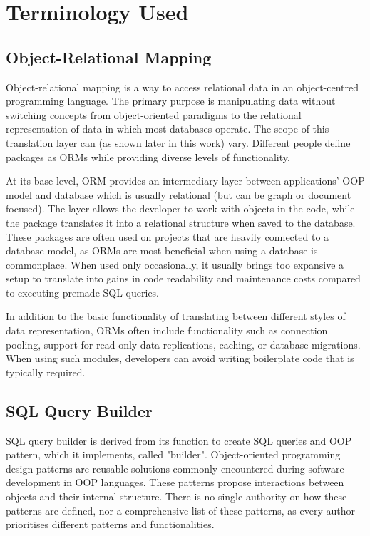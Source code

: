 \chapter{Terminology Used}
\section{Object-Relational Mapping}

Object-relational mapping is a way to access relational data in an
object-centred programming language. The primary purpose is manipulating data
without switching concepts from object-oriented paradigms to the relational
representation of data in which most databases operate. The scope of this
translation layer can (as shown later in this work) vary. Different people
define packages as ORMs while providing diverse levels of functionality.

At its base level, ORM provides an intermediary layer between applications' OOP
model and database which is usually relational (but can be graph or document
focused). The layer allows the developer to work with objects in the code, while
the package translates it into a relational structure when saved to the
database. These packages are often used on projects that are heavily connected
to a database model, as ORMs are most beneficial when using a database is
commonplace. When used only occasionally, it usually brings too expansive a
setup to translate into gains in code readability and maintenance costs compared
to executing premade SQL queries.

In addition to the basic functionality of translating between different styles
of data representation, ORMs often include functionality such as connection
pooling, support for read-only data replications, caching, or database
migrations. When using such modules, developers can avoid writing boilerplate
code that is typically required.


\section{SQL Query Builder}

SQL query builder is derived from its function to create SQL queries and OOP
pattern, which it implements, called "builder". Object-oriented programming
design patterns are reusable solutions commonly encountered during software
development in OOP languages. These patterns propose interactions between
objects and their internal structure. There is no single authority on how these
patterns are defined, nor a comprehensive list of these patterns, as every
author prioritises different patterns and functionalities.

